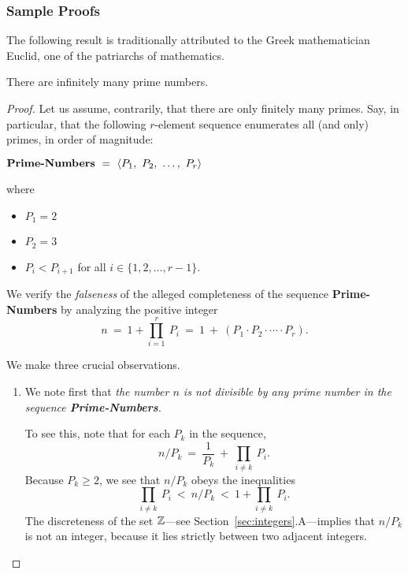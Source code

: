 \subsubsection{Sample Proofs}
\label{sec:sample-contradictions}

%
The following result is traditionally attributed to the Greek
mathematician Euclid,
one of the patriarchs of mathematics.

\begin{prop}
\label{thm:Primes-infinite}
There are infinitely many prime numbers.
\end{prop}

\begin{proof}
Let us assume, contrarily, that there are only finitely many primes.
Say, in particular, that the following $r$-element sequence enumerates
all (and only) primes, in order of magnitude:

$\mbox{\bf Prime-Numbers} \ = \ 
\langle P_1, \ P_2, \ \ldots, \ P_r \rangle$

\noindent where
\begin{itemize}
\item
$P_1 = 2$
\item
$P_2 = 3$
\item
$P_i < P_{i+1}$ for all $i \in \{1, 2, \ldots, r-1\}$.
\end{itemize}

We verify the {\em falseness} of the alleged completeness of the sequence
{\bf Prime-Numbers} by analyzing the positive integer
\[ n \ = \ 1 + \prod_{i=1}^r \ P_i \ = \ 1 \ + \ 
\left(P_1 \cdot P_2 \cdot \cdots \cdot P_r \right).
\]

We make three crucial observations.

\begin{enumerate}
\item
We note first that {\em the number $n$ is not divisible by any prime
number  in the sequence {\bf Prime-Numbers}.}

To see this, note that for each $P_k$ in the sequence,
\[
n / P_k \ = \ \frac{1}{P_k} \ + \ \prod_{i \neq k} \ P_i .
\]
Because $P_k \geq 2$, we see that $n / P_k$ obeys the inequalities
\[
\prod_{i \neq k} \ P_i \ < \ n/P_k \ < \ 1 + \prod_{i \neq k} \ P_i.
\] 
The discreteness of the set $\mathbb{Z}$---see
Section~\ref{sec:integers}.A---implies that $n / P_k$ is not an
integer, because it lies strictly between two adjacent integers.


\end{enumerate}
\end{proof}
